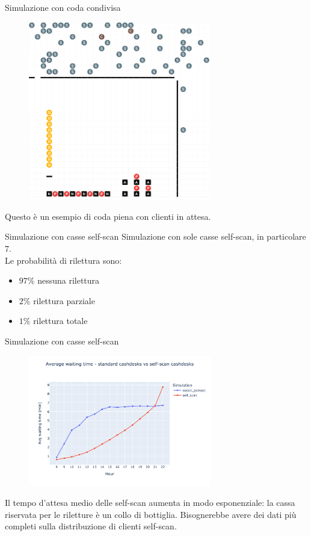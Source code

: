 \begin{frame}{Simulazione con coda condivisa}
	\begin{figure}[H]
		\centering
		\includegraphics[width=8cm]{"../report/images/results/codacondivisa_screenshot.png"}
	\end{figure}
	Questo è un esempio di coda piena con clienti in attesa.
\end{frame}

\begin{frame}{Simulazione con casse self-scan}
	Simulazione con sole casse self-scan, in particolare 7. \\
	Le probabilità di rilettura sono:
	\begin{itemize}
		\item $97 \%$ nessuna rilettura
		\item $2 \%$ rilettura parziale
		\item $1 \%$ rilettura totale
	\end{itemize}
\end{frame}

\begin{frame}{Simulazione con casse self-scan}
	\begin{figure}[H]
		\centering
		\includegraphics[width=8cm]{"../report/images/results/avg_wt_selfscan.png"}
	\end{figure}
	Il tempo d'attesa medio delle self-scan aumenta in modo esponenziale: la cassa riservata per le riletture è un collo di bottiglia. Bisognerebbe avere dei dati più completi sulla distribuzione di clienti self-scan.
\end{frame}

